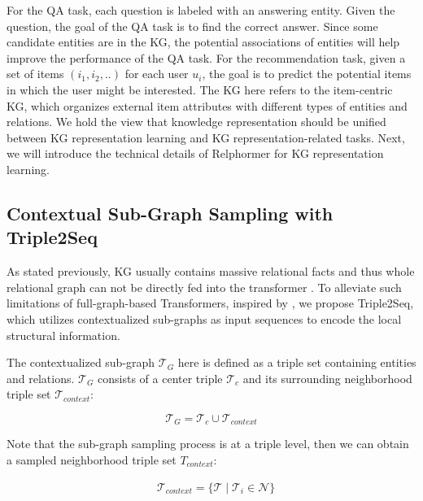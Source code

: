 \documentclass[sigconf]{acmart}
\newcommand{\bizhen}[1]{{\color{black}#1}}
\begin{document}
For the QA task, each question is labeled with an answering entity.
Given the question, the goal of the QA task is to find the correct answer.
Since some candidate entities are in the KG, the potential associations of entities will help improve the performance of the QA task.
For the recommendation task, given a set of items $(i_1, i_2, ..)$ for each user $u_i$, the goal is to predict the potential items in which the user might be interested.
The KG here refers to the item-centric KG, which organizes external item attributes with different types of entities and relations.
We hold the view that knowledge representation should be unified between KG representation learning and KG representation-related tasks.
Next, we will introduce the technical details of Relphormer for KG representation learning.


\subsection{Contextual Sub-Graph Sampling with Triple2Seq}
\label{sec:Triple2Seq}

As stated previously, KG usually contains massive relational facts and thus whole relational graph can not be directly fed into the transformer .
To alleviate such limitations of full-graph-based Transformers, inspired by \cite{Gophormer}, we propose Triple2Seq, which utilizes contextualized sub-graphs as input sequences to encode the local structural information.

The contextualized sub-graph $\mathcal{T}_G$  here is defined as a \bizhen{triple set} containing entities and relations.
$\mathcal{T}_G$ consists of a center triple \bizhen{$\mathcal{T}_c$} and its surrounding neighborhood \bizhen{triple} set $\mathcal{T}_{context}$:

\begin{equation}
    \mathcal{T}_G = \mathcal{T}_c \cup \mathcal{T} _{context} 
\end{equation}


Note that the sub-graph sampling process is at a triple level, then we can obtain a sampled neighborhood \bizhen{triple set} $T_{context}$:

\bizhen{
\begin{small}
\begin{equation}
\begin{aligned}
        &  \mathcal{T}_{context} = \{ \mathcal{T} \mid \mathcal{T}_i \in \mathcal{N}  \}
\end{aligned}
\end{equation}
\end{small}
}
\end{document}
